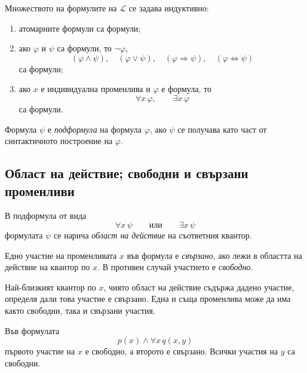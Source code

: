 \begin{defn}
Множеството на формулите на $\mathcal L$ се задава индуктивно:
\begin{enumerate}
\item атомарните формули са формули;
\item ако $\varphi$ и $\psi$ са формули, то $\neg\varphi$,
\[
(\varphi\wedge\psi),\quad
(\varphi\vee\psi),\quad
(\varphi\Rightarrow\psi),\quad
(\varphi\Leftrightarrow\psi)
\]
са формули;
\item ако $x$ е индивидуална променлива и $\varphi$ е формула, то
\[
\forall x\,\varphi,\qquad \exists x\,\varphi
\]
са формули.
\end{enumerate}
\end{defn}

\begin{defn}
Формула $\psi$ е \emph{подформула} на формула $\varphi$, ако $\psi$ се получава като част от синтактичното построение на $\varphi$.
\end{defn}

\subsection{Област на действие; свободни и свързани променливи}\label{s:21.1.4}

\begin{defn}
В подформула от вида
\[
\forall x\,\psi\qquad\text{или}\qquad\exists x\,\psi
\]
формулата $\psi$ се нарича \emph{област на действие} на съответния квантор.
\end{defn}

\begin{defn}
Едно участие на променливата $x$ във формула е \emph{свързано}, ако лежи в областта на действие на квантор по $x$. В противен случай участието е \emph{свободно}.
\end{defn}

Най-близкият квантор по $x$, чиято област на действие съдържа дадено участие, определя дали това участие е свързано. Една и съща променлива може да има както свободни, така и свързани участия.

\begin{example}
Във формулата
\[
p(x)\wedge\forall x\,q(x,y)
\]
първото участие на $x$ е свободно, а второто е свързано. Всички участия на $y$ са свободни.
\end{example}

